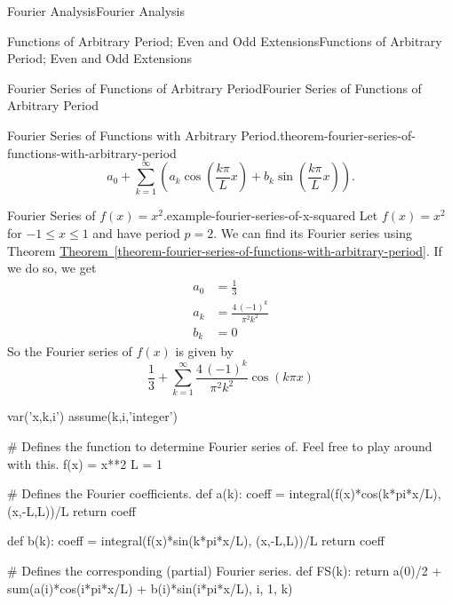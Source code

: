 \documentclass[10pt,]{book}
\numberwithin{equation}{section}
\begin{document}
\begin{chapterptx}{Fourier Analysis}{}{Fourier Analysis}{}{}
\begin{sectionptx}{Functions of Arbitrary Period; Even and Odd Extensions}{}{Functions of Arbitrary Period; Even and Odd Extensions}{}{}
\begin{subsectionptx}{Fourier Series of Functions of Arbitrary Period}{}{Fourier Series of Functions of Arbitrary Period}{}{}
\begin{theorem}{Fourier Series of Functions with Arbitrary Period.}{}{theorem-fourier-series-of-functions-with-arbitrary-period}
\begin{equation*}
a_{0}+\sum_{k=1}^{\infty}\left(a_{k}\cos\left(\frac{k\pi}{L}x\right)+b_{k}\sin\left(\frac{k\pi}{L}x\right)\right).
\end{equation*}
%
\end{theorem}
\begin{example}{Fourier Series of \(f(x) = x^{2}\).}{example-fourier-series-of-x-squared}%
\hypertarget{p-397}{}%
Let \(f(x) = x^{2}\) for \(-1\leq x\leq 1\) and have period \(p=2\). We can find its Fourier series using Theorem \hyperref[theorem-fourier-series-of-functions-with-arbitrary-period]{Theorem~\ref{theorem-fourier-series-of-functions-with-arbitrary-period}}. If we do so, we get%
\begin{align*}
a_{0} &= \frac{1}{3}\\
a_{k} &= \frac{4 \, \left(-1\right)^{k}}{\pi^{2} k^{2}}\\
b_{k} &= 0
\end{align*}
So the Fourier series of \(f(x)\) is given by%
\begin{equation*}
\frac{1}{3} + \sum_{k=1}^{\infty}\frac{4 \, \left(-1\right)^{k}}{\pi^{2} k^{2}}\cos\left(k\pi x\right)
\end{equation*}
%
\end{example}
\begin{sageinput}
var('x,k,i')
assume(k,i,'integer')

# Defines the function to determine Fourier series of. Feel free to play around with this.
f(x) = x**2
L = 1

# Defines the Fourier coefficients.
def a(k):
coeff = integral(f(x)*cos(k*pi*x/L), (x,-L,L))/L
return coeff

def b(k):
coeff = integral(f(x)*sin(k*pi*x/L), (x,-L,L))/L
return coeff

# Defines the corresponding (partial) Fourier series.
def FS(k): 
return a(0)/2 + sum(a(i)*cos(i*pi*x/L) + b(i)*sin(i*pi*x/L), i, 1, k)


\end{sageinput}
\end{subsectionptx}
\end{sectionptx}
\end{chapterptx}
\end{document}
